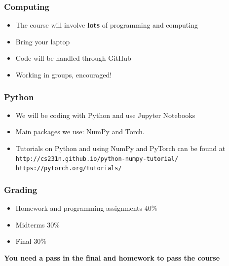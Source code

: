 \documentclass[12pt,fleqn]{beamer}
\begin{document}
\begin{frame}
\frametitle{Computing}

\begin{itemize}
\item The course will involve {\bf lots} of programming and computing
\item Bring your laptop
\item Code will be handled through GitHub
\item Working in groups, encouraged!
\end{itemize}

\end{frame}

\begin{frame}
\frametitle{Python}

\begin{itemize}
\item We will be coding with Python and use Jupyter Notebooks
\item Main packages we use: NumPy and Torch.
\item Tutorials on Python and using NumPy and PyTorch can be found at \\
{\tt http://cs231n.github.io/python-numpy-tutorial/} \\
{\tt https://pytorch.org/tutorials/}
\end{itemize}

\end{frame}


\begin{frame}
\frametitle{Grading}

\begin{itemize}
\item Homework and programming assignments $40\%$
\item Midterms $30\%$
\item Final $30\%$ 
\end{itemize}

{\bf You need a pass in the final and homework to pass the course}



\end{frame}
\end{document}
